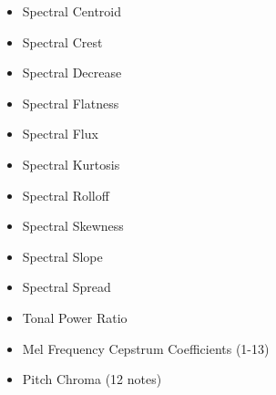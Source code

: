 \documentclass[12pt]{article}
\begin{document}
\begin{itemize}
\item Spectral Centroid
\item Spectral Crest
\item Spectral Decrease
\item Spectral Flatness
\item Spectral Flux
\item Spectral Kurtosis
\item Spectral Rolloff
\item Spectral Skewness
\item Spectral Slope
\item Spectral Spread
\item Tonal Power Ratio
\item Mel Frequency Cepstrum Coefficients (1-13)
\item Pitch Chroma (12 notes)
\end{itemize}
\end{document}
